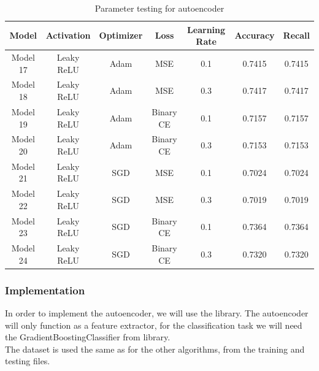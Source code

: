 \begin{table}[H]
    \centering
    \begin{tabular}{|c|c|c|c|c|c|c|}
        \hline
        \rowcolor{lightgreen}
        \textbf{Model} & \textbf{Activation} & \textbf{Optimizer} & \textbf{Loss} & \textbf{Learning Rate} & \textbf{Accuracy} & \textbf{Recall} \\
        \hline
        Model 17 & Leaky ReLU & Adam & MSE & 0.1 & 0.7415 & 0.7415 \\
        \hline
        Model 18 & Leaky ReLU & Adam & MSE & 0.3 & 0.7417 & 0.7417 \\
        \hline
        Model 19 & Leaky ReLU & Adam & Binary CE & 0.1 & 0.7157 & 0.7157 \\
        \hline
        Model 20 & Leaky ReLU & Adam & Binary CE & 0.3 & 0.7153 & 0.7153 \\
        \hline
        Model 21 & Leaky ReLU & SGD & MSE & 0.1 & 0.7024 & 0.7024 \\
        \hline
        Model 22 & Leaky ReLU & SGD & MSE & 0.3 & 0.7019 & 0.7019 \\
        \hline
        Model 23 & Leaky ReLU & SGD & Binary CE & 0.1 & 0.7364 & 0.7364 \\
        \hline
        Model 24 & Leaky ReLU & SGD & Binary CE & 0.3 & 0.7320 & 0.7320 \\
        \hline
    \end{tabular}
    \caption{Parameter testing for autoencoder}
    \label{tab:op4}
\end{table}





\subsubsection{Implementation}
In order to implement the autoencoder, we will use the  library. The autoencoder will only function as a feature extractor, for the classification task we will need the {GradientBoostingClassifier} from  library.\\

\noindent The dataset is used the same as for the other algorithms, from the training and testing files.

\vspace{0.5cm}

\vspace{0.5cm}

